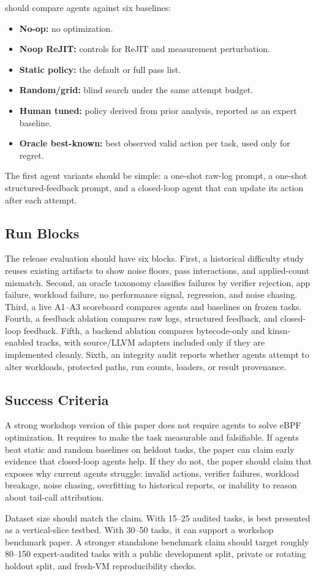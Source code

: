 \sys should compare agents against six baselines:
\begin{itemize}
  \item \textbf{No-op:} no optimization.
  \item \textbf{Noop ReJIT:} controls for ReJIT and measurement perturbation.
  \item \textbf{Static policy:} the default or full pass list.
  \item \textbf{Random/grid:} blind search under the same attempt budget.
  \item \textbf{Human tuned:} policy derived from prior analysis, reported as an expert baseline.
  \item \textbf{Oracle best-known:} best observed valid action per task, used only for regret.
\end{itemize}

The first agent variants should be simple: a one-shot raw-log prompt, a one-shot structured-feedback prompt, and a closed-loop agent that can update its action after each attempt.

\subsection{Run Blocks}

The release evaluation should have six blocks. First, a historical difficulty study reuses existing artifacts to show noise floors, pass interactions, and applied-count mismatch. Second, an oracle taxonomy classifies failures by verifier rejection, app failure, workload failure, no performance signal, regression, and noise chasing. Third, a live A1--A3 scoreboard compares agents and baselines on frozen tasks. Fourth, a feedback ablation compares raw logs, structured feedback, and closed-loop feedback. Fifth, a backend ablation compares bytecode-only and kinsn-enabled tracks, with source/LLVM adapters included only if they are implemented cleanly. Sixth, an integrity audit reports whether agents attempt to alter workloads, protected paths, run counts, loaders, or result provenance.

\subsection{Success Criteria}

A strong workshop version of this paper does not require agents to solve eBPF optimization. It requires \sys to make the task measurable and falsifiable. If agents beat static and random baselines on heldout tasks, the paper can claim early evidence that closed-loop agents help. If they do not, the paper should claim that \sys exposes why current agents struggle: invalid actions, verifier failures, workload breakage, noise chasing, overfitting to historical reports, or inability to reason about tail-call attribution.

Dataset size should match the claim. With 15--25 audited tasks, \sys is best presented as a vertical-slice testbed. With 30--50 tasks, it can support a workshop benchmark paper. A stronger standalone benchmark claim should target roughly 80--150 expert-audited tasks with a public development split, private or rotating holdout split, and fresh-VM reproducibility checks.
